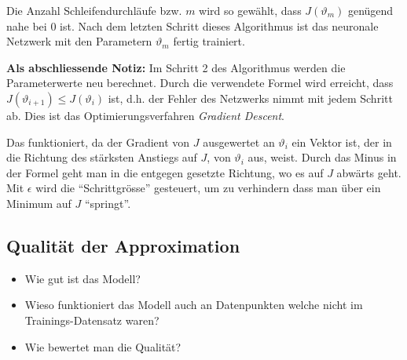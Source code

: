 Die Anzahl Schleifendurchläufe bzw. \( m \) wird so gewählt, dass \( J(\vartheta_m) \) genügend nahe bei 0 ist.
Nach dem letzten Schritt dieses Algorithmus ist das neuronale Netzwerk mit den Parametern \( \vartheta_m \) fertig trainiert.

\textbf{Als abschliessende Notiz:} Im Schritt 2 des Algorithmus werden die Parameterwerte neu berechnet.
Durch die verwendete Formel wird erreicht, dass \( J(\vartheta_{i+1}) \leq J(\vartheta_i) \) ist, d.h. der Fehler des Netzwerks nimmt mit jedem Schritt ab.
Dies ist das Optimierungsverfahren \emph{Gradient Descent}.

Das funktioniert, da der Gradient von \( J \) ausgewertet an \( \vartheta_i \) ein Vektor ist, der in die Richtung des stärksten Anstiegs auf \( J \), von \(\vartheta_i \) aus, weist.
Durch das Minus in der Formel geht man in die entgegen gesetzte Richtung, wo es auf \( J \) abwärts geht. 
Mit \( \epsilon \) wird die ``Schrittgrösse'' gesteuert, um zu verhindern dass man über ein Minimum auf \( J \) ``springt''.


\subsection{Qualität der Approximation}\label{neuronal:subsection:qualität_nn}

\begin{itemize}
    \item Wie gut ist das Modell?
    \item Wieso funktioniert das Modell auch an Datenpunkten welche nicht im Trainings-Datensatz waren?
    \item Wie bewertet man die Qualität?
\end{itemize}
